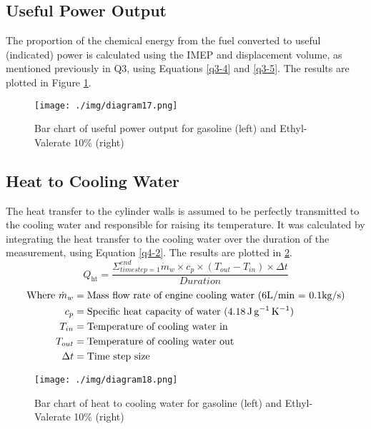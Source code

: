 \subsection*{Useful Power Output}
The proportion of the chemical energy from the fuel converted to useful (indicated) power is calculated using the IMEP and displacement volume, as mentioned previously in Q3, using Equations \ref{q3-4} and \ref{q3-5}. The results are plotted in Figure \ref{q4-f2}.
\begin{figure}[H]
    \centering
    \texttt{[image: ./img/diagram17.png]}
    \caption{Bar chart of useful power output for gasoline (left) and Ethyl-Valerate 10\% (right)}
    \label{q4-f2}
\end{figure}
\subsection*{Heat to Cooling Water}
The heat transfer to the cylinder walls is assumed to be perfectly transmitted to the cooling water and responsible for raising its temperature. It was calculated by integrating the heat transfer to the cooling water over the duration of the measurement, using Equation \ref{q4-2}. The results are plotted in \ref{q4-f3}.
\begin{equation}
    Q_\textrm{ht} = \frac{\Sigma^{end}_{time step=1} \dot{m}_w \times c_p \times (T_{out} - T_{in}) \times \Delta t}{Duration} \label{q4-2}
\end{equation}
\begin{align*}
    \textrm{Where }
    \dot{m}_w & = \textrm{Mass flow rate of engine cooling water (6L/min = 0.1kg/s)}               \\
    c_p       & = \textrm{Specific heat capacity of water (\SI{4.18}{\joule\per\gram\per\kelvin})} \\
    T_{in}    & = \textrm{Temperature of cooling water in}                                         \\
    T_{out}   & = \textrm{Temperature of cooling water out}                                        \\
    \Delta t  & = \textrm{Time step size}
\end{align*}
\begin{figure}[H]
    \centering
    \texttt{[image: ./img/diagram18.png]}
    \caption{Bar chart of heat to cooling water for gasoline (left) and Ethyl-Valerate 10\% (right)}
    \label{q4-f3}
\end{figure}
